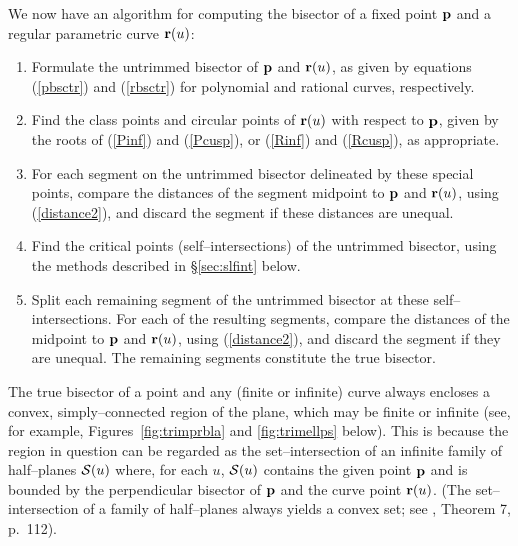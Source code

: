 
We now have an algorithm for computing the bisector of a fixed point
${\bf p}$ and a regular parametric curve ${\bf r}(u)$:

\begin{enumerate}
\item
        Formulate the untrimmed bisector of ${\bf p}$ and ${\bf r}(u)$,
        as given by equations (\ref{pbsctr}) and (\ref{rbsctr}) for
        polynomial and rational curves, respectively.
\item
        Find the class points and circular points of ${\bf r}(u)$ with
        respect to ${\bf p}$, given by the roots of (\ref{Pinf}) and
        (\ref{Pcusp}), or (\ref{Rinf}) and (\ref{Rcusp}), as appropriate.
\item
        For each segment on the untrimmed bisector delineated by these
        special points, compare the distances of the segment midpoint
        to ${\bf p}$ and ${\bf r}(u)$, using (\ref{distance2}), and
        discard the segment if these distances are unequal.
\item
        Find the critical points (self--intersections) of the untrimmed
        bisector, using the methods described in \S\ref{sec:slfint}
        below.
\item
        Split each remaining segment of the untrimmed bisector at these
        self--intersections. For each of the resulting segments, compare
        the distances of the midpoint to ${\bf p}$ and ${\bf r}(u)$,
        using (\ref{distance2}), and discard the segment if they are
        unequal. The remaining segments constitute the true bisector.
\end{enumerate}


\begin{rmk}
{\rm
The true bisector of a point and any (finite or infinite) curve always
encloses a convex, simply--connected region of the plane, which may
be finite or infinite (see, for example, Figures~\ref{fig:trimprbla}
and \ref{fig:trimellps} below). This is because the region in question
can be regarded as the set--intersection of an infinite family of
half--planes ${\cal S}(u)$ where, for each $u$, ${\cal S}(u)$ contains
the given point ${\bf p}$ and is bounded by the perpendicular bisector
of ${\bf p}$ and the curve point ${\bf r}(u)$. (The set--intersection
of a family of half--planes always yields a convex set; see \cite
{kelly79}, Theorem 7, p.~112).
}
\end{rmk}

